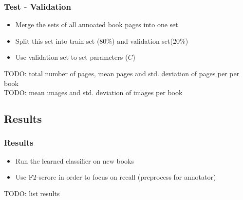 \begin{frame}
\frametitle{Test - Validation}
\begin{itemize}
\item Merge the sets of all annoated book pages into one set
\item Split this set into train set ($80\%$) and validation set($20\%$)
\item Use validation set to set parameters ($C$)
\end{itemize}
TODO: total number of pages, mean pages and std. deviation of pages per per book \\
TODO: mean images and std. deviation of images per book
\end{frame}

\subsection{Results}
\begin{frame}
\frametitle{Results}
\begin{itemize}
\item Run the learned classifier on new books
\item Use F2-scrore in order to focus on recall (preprocess for annotator)
\end{itemize}
TODO: list results

\end{frame}
